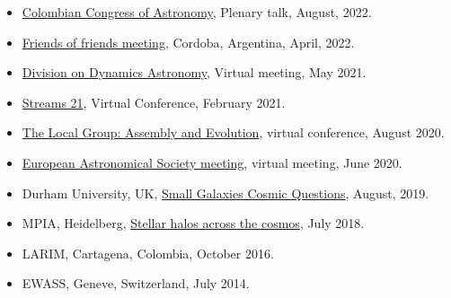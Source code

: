 \documentclass[UTF8]{article}
\begin{document}
\begin{itemize}
  \setlength\itemsep{0.0em}
  \renewcommand\labelitemi{$\cdot$}


\item \href{https://accefyn.com/microsites/nodos/astroco/congreso-colombiano-de-astronomia-cocoa-2022%E2%80%8B/}{Colombian Congress of Astronomy}, Plenary talk, August, 2022. \dag

\item \href{http://fof.oac.uncor.edu/2022/}{Friends of friends meeting}, Cordoba, Argentina, April, 2022.
\item \href{https://aas.org/meetings/dda52}{Division on Dynamics Astronomy}, Virtual meeting, May 2021.
\item \href{https://stellarstreams.org/streams21/}{Streams 21}, Virtual
  Conference, February 2021. 
\item  \href{https://www.stsci.edu/contents/events/stsci/2020/april/the-local-group-assembly-and-evolution?page=2&filterUUID=6fedb8a7-}{The Local Group: Assembly and Evolution}, virtual conference, August 2020.
\item \href{https://eas.unige.ch/EAS2020/}{European Astronomical Society meeting}, virtual meeting, June 2020.
\item Durham University, UK, \href{http://astro.dur.ac.uk/cosmodwarfs/}{Small Galaxies Cosmic Questions}, August, 2019.
\item MPIA, Heidelberg, \href{http://www.mpia.de/homes/stellarhalos2018-loc/sh2018/index.html}{Stellar halos across the cosmos}, July 2018.
\item LARIM, Cartagena, Colombia, October 2016.
\item EWASS, Geneve, Switzerland, July 2014.
\end{itemize}
  
\end{document}
